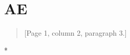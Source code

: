 {}
\section*{AE}\hfill

\begin{aecomment}
\lipsum[2][1-3]
\end{aecomment}

\begin{response}
\lipsum[4]
\end{response}

\begin{quote}[Page 1, column 2, paragraph 3.]
\lipsum[5][1-2]
\end{quote}

\begin{response}*
\lipsum[9][1-2]
\end{response}

\begin{aecomment}
\lipsum[2][3-4]
\end{aecomment}